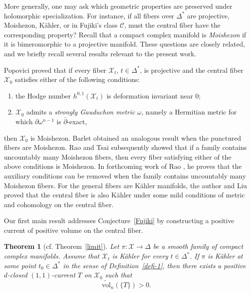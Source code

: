 \documentclass[11pt,letterpaper]{amsart}
\numberwithin{equation}{section}
\newcommand{\cal}{\mathcal}
\def\cX{{\cal X}}
\newtheorem{theo}[prop]{Theorem}
\begin{document}
More generally, one may ask which geometric properties are preserved under holomorphic specialization. For instance, if all fibers over $\Delta^*$ are projective, Moishezon, K\"ahler, or in Fujiki's class $\mathcal C$, must the central fiber have the corresponding property? Recall that a compact complex manifold is \emph{Moishezon} if it is bimeromorphic to a projective manifold. These questions are closely related, and we briefly recall several results relevant to the present work.

Popovici \cite{Po13} proved that if every fiber $\cX_t$, $t\in\Delta^*$, is projective and the central fiber $\cX_0$ satisfies either of the following conditions:
\begin{enumerate}
\item the Hodge number $h^{0,1}(\cX_t)$ is deformation invariant near $0$;
\item $\cX_0$ admits a \emph{strongly Gauduchon metric} $\omega$, namely a Hermitian metric for which $\partial\omega^{n-1}$ is $\bar\partial$-exact,
\end{enumerate}
then $\cX_0$ is Moishezon. Barlet \cite{Ba15} obtained an analogous result when the punctured fibers are Moishezon. Rao and Tsai \cite{RT21} subsequently showed that if a family contains uncountably many Moishezon fibers, then every fiber satisfying either of the above conditions is Moishezon. In forthcoming work of Rao \cite{R}, he proves that the auxiliary conditions can be removed when the family contains uncountably many Moishezon fibers. For the general fibers are K\"ahler manifolds, the author and Liu \cite{LL24} proved that the central fiber is also K\"ahler under some mild conditions of metric and cohomology on the central fiber.

Our first main result addresses Conjecture~\ref{Fujiki} by constructing a positive current of positive volume on the central fiber.
\begin{theo}[cf. Theorem~\ref{limit}]\label{projective}
Let $\pi:\cX\to\Delta$ be a smooth family of compact complex manifolds. Assume that $\cX_t$ is K\"ahler for every $t\in\Delta^*$. If $\pi$ is K\"ahler at some point $t_0\in\Delta^*$ in the sense of Definition~\ref{defi-1}, then there exists a positive $d$-closed $(1,1)$-current $T$ on $\cX_0$ such that
\[
 \widetilde{\mathrm{vol}}_n(\{T\})>0.
\]
\end{theo}
\end{document}
